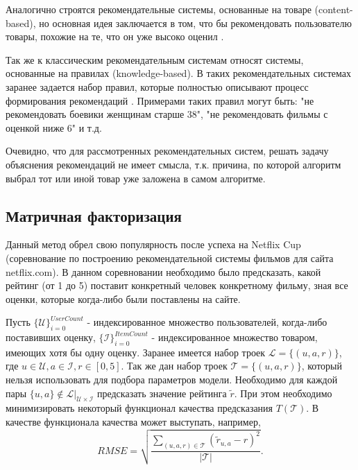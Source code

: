\documentclass[12pt,a4paper]{report}
\begin{document}
Аналогично строятся рекомендательные системы, основанные на товаре (content-based), но основная идея заключается в том, что бы рекомендовать пользователю товары, похожие на те, что он уже высоко оценил \cite{Cbrs}.

Так же к классическим рекомендательным системам относят системы, основанные на правилах (knowledge-based). В таких рекомендательных системах заранее задается набор правил, которые полностью описывают процесс формирования рекомендаций \cite{Know}. Примерами таких правил могут быть: "не рекомендовать боевики женщинам старше 38", "не рекомендовать фильмы с оценкой ниже 6" и т.д. 

Очевидно, что для рассмотренных рекомендательных систем, решать задачу объяснения рекомендаций не имеет смысла, т.к. причина, по которой алгоритм выбрал тот или иной товар уже заложена в самом алгоритме.
\subsection{Матричная факторизация}
Данный метод обрел свою популярность после успеха на Netflix Cup (соревнование по построению рекомендательной системы фильмов для сайта netflix.com). В данном соревновании необходимо было предсказать, какой рейтинг (от 1 до 5) поставит конкретный человек конкретному фильму, зная все оценки, которые когда-либо были поставлены на сайте.

Пусть $\{\mathcal{U}\}_{i=0}^{UserCount}$  - индексированное множество пользователей, когда-либо поставивших оценку, $\{\mathcal{I}\}_{i=0}^{ItemCount}$ - индексированное множество товаром, имеющих хотя бы одну оценку. Заранее имеется набор троек $\mathcal{L} = \{(u, a, r)\}$, где $u \in \mathcal{U}, a \in \mathcal{I}, r \in [0, 5]$. Так же дан набор троек $\mathcal{T} = \{(u, a, r)\}$, который нельзя использовать для подбора параметров модели. Необходимо для каждой пары $\{u,a\} \notin \mathcal{L|_{\mathcal{U}\times\mathcal{I}}}$ предсказать значение рейтинга $\tilde{r}$. При этом необходимо минимизировать некоторый функционал качества предсказания $T(\mathcal{T})$. В качестве функционала качества может выступать, например, 
\begin{equation*}
RMSE = \sqrt{\frac{\sum_{(u, a, r) \in \mathcal{T}}(\tilde{r}_{u,a} - r)^2}{|\mathcal{T}|}}.
\end{equation*}
\end{document}
